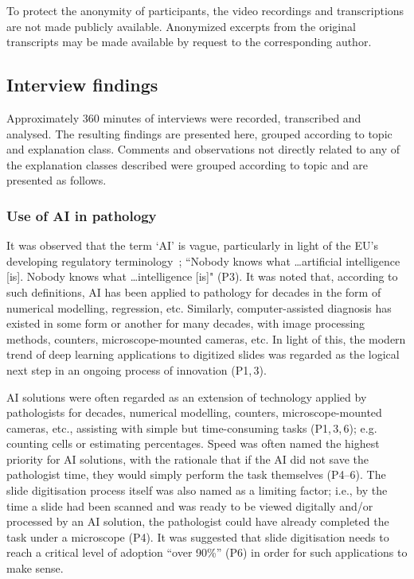 \documentclass[final,5p,times,twocolumn,hyphens]{elsarticle}
\begin{document}
To protect the anonymity of participants, the video recordings and transcriptions are not made publicly available. Anonymized excerpts from the original transcripts may be made available by request to the corresponding author.

\subsection{Interview findings}

Approximately 360 minutes of interviews were recorded, transcribed and analysed. The resulting findings are presented here, grouped according to topic and explanation class. Comments and observations not directly related to any of the explanation classes described were grouped according to topic and are presented as follows.

\subsubsection{Use of AI in pathology}

It was observed that the term `AI' is vague,  particularly in light of the EU's developing regulatory terminology~\cite{ISO_IEC_22989}; ``Nobody knows what \dots artificial intelligence [is]. Nobody knows what \dots intelligence [is]" (P3). It was noted that, according to such definitions, AI has been applied to pathology for decades in the form of numerical modelling, regression, etc. Similarly, computer-assisted diagnosis has existed in some form or another for many decades, with image processing methods, counters, microscope-mounted cameras, etc. In light of this, the modern trend of deep learning applications to digitized slides was regarded as the logical next step in an ongoing process of innovation (P1,\,3).

AI solutions were often regarded as an extension of technology applied by pathologists for decades, numerical modelling, counters, microscope-mounted cameras, etc., assisting with simple but time-consuming tasks (P1,\,3,\,6); e.g. counting cells or estimating percentages. Speed was often named the highest priority for AI solutions, with the rationale that if the AI did not save the pathologist time, they would simply perform the task themselves (P4--6). The slide digitisation process itself was also named as a limiting factor; i.e., by the time a slide had been scanned and was ready to be viewed digitally and/or processed by an AI solution, the pathologist could have already completed the task under a microscope (P4). It was suggested that slide digitisation needs to reach a critical level of adoption ``over 90\%'' (P6) in order for such applications to make sense.
\end{document}
